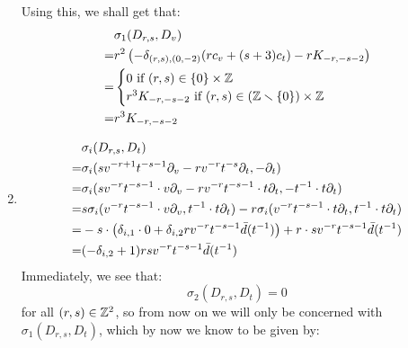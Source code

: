 \begin{example}
\begin{enumerate}
                Using this, we shall get that:
                    $$
                        \begin{aligned}
                            & \sigma_1(D_{r, s}, D_v)
                            \\
                            = & r^2 \left( -\delta_{(r, s), (0, -2)} ( r c_v + (s + 3) c_t ) - r K_{-r, -s - 2} \right)
                            \\
                            = &
                            \begin{cases}
                                \text{$0$ if $(r, s) \in \{0\} \x \Z$}
                                \\
                                \text{$r^3 K_{-r, -s - 2}$ if $(r, s) \in (\Z \setminus \{0\}) \x \Z$}
                            \end{cases}
                            \\
                            = & r^3 K_{-r, -s - 2}
                        \end{aligned}
                    $$
                \item
                    $$
                        \begin{aligned}
                            & \sigma_i(D_{r, s}, D_t)
                            \\
                            = & \sigma_i( s v^{-r + 1} t^{-s - 1} \partial_v - r v^{-r} t^{-s} \partial_t, -\partial_t )
                            \\
                            = & \sigma_i( s v^{-r} t^{-s - 1} \cdot v \partial_v - r v^{-r} t^{-s - 1} \cdot t \partial_t, -t^{-1} \cdot t\partial_t )
                            \\
                            = & s \sigma_i( v^{-r} t^{-s - 1} \cdot v \partial_v, t^{-1} \cdot t\partial_t ) - r\sigma_i( v^{-r} t^{-s- 1} \cdot t \partial_t, t^{-1} \cdot t\partial_t )
                            \\
                            = & -s \cdot \left( \delta_{i, 1} \cdot 0 + \delta_{i, 2} r v^{-r} t^{-s - 1} \bar{d}(t^{-1}) \right) + r \cdot s v^{-r} t^{-s - 1} \bar{d}(t^{-1})
                            \\
                            = & (-\delta_{i, 2} + 1) rs v^{-r} t^{-s - 1} \bar{d}(t^{-1})
                        \end{aligned}
                    $$
                Immediately, we see that:
                    $$\sigma_2(D_{r, s}, D_t) = 0$$
                for all $(r, s) \in \mathbb{Z}^2$, so from now on we will only be concerned with $\sigma_1(D_{r, s}, D_t)$, which by now we know to be given by:

\end{enumerate}
\end{example}
